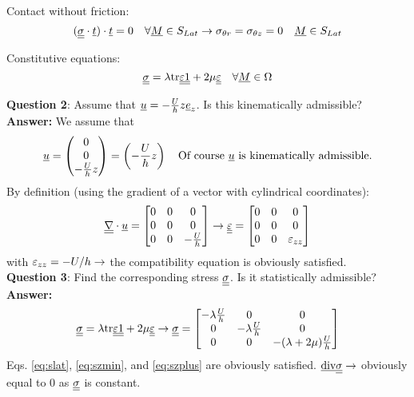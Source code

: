 Contact without friction:
\begin{equation}
(\underline{\underline{\sigma}} \cdot \underline{t})\cdot \underline{t} = 0 \quad \forall \underline{M} \in S_{Lat} \rightarrow \sigma_{\theta r} = \sigma_{\theta z} = 0 \quad \underline{M} \in S_{Lat}
\label{eq:slat}
\end{equation}

Constitutive equations:
\begin{equation}
\underline{\underline{\sigma}} = \lambda \text{tr} \underline{\underline{\varepsilon}} \underline{\underline{1}} + 2 \mu \underline{\underline{\varepsilon}} \quad \forall \underline{M} \in \Omega
\end{equation}



\noindent \textbf{Question 2}: Assume that $\underline{u} = - \frac{U}{h} z \underline{e}_z $. Is this kinematically admissible? \\

\textbf{Answer:} We assume that
\begin{equation}
\underline{u} = \left(
\begin{matrix}
0 \\ 0 \\ -\frac{U}{h}z
\end{matrix}
\right) = \left(
-\frac{U}{h}z
\right) \quad \text{Of course } \underline{u} \text{ is kinematically admissible.}
\end{equation}
By definition (using the gradient of a vector with cylindrical coordinates):
\begin{equation}
\underline{\underline{\nabla}} \cdot \underline{u} = \left[
\begin{matrix}
0 &0 &0 \\
0 &0 &0 \\
0 &0 &-\frac{U}{h} \\
\end{matrix}
\right] \rightarrow \underline{\underline{\varepsilon}} = \left[
\begin{matrix}
0 &0 &0 \\
0 &0 &0 \\
0 &0 & \varepsilon_{zz} \\
\end{matrix}
\right]
\end{equation}
with $\varepsilon_{zz} = -U/h \rightarrow $ the compatibility equation is obviously satisfied. \\

\noindent \textbf{Question 3}: Find the corresponding stress $\underline{\underline{\sigma}}$. Is it statistically admissible? \\

\textbf{Answer:} 
\begin{equation}
\underline{\underline{\sigma}} = \lambda \text{tr} \underline{\underline{\varepsilon}} \underline{\underline{1}} + 2 \mu \underline{\underline{\varepsilon}} \rightarrow \underline{\underline{\sigma}} = \left[
\begin{matrix}
-\lambda \frac{U}{h} &0 &0 \\
0 &-\lambda \frac{U}{h} &0 \\
0 &0 & -(\lambda+2\mu) \frac{U}{h} \\
\end{matrix}
\right]
\end{equation} 
Eqs. \ref{eq:slat}, \ref{eq:szmin}, and \ref{eq:szplus} are obviously satisfied.
$\text{\underline{div}} \underline{\underline{\sigma}} \rightarrow$ obviously equal to 0 as $\underline{\underline{\sigma}} $ is constant. \\

